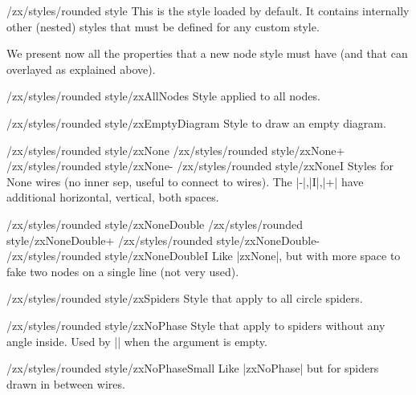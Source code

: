 \documentclass[a4paper,doc2]{ltxdoc} %
\begin{document}
\begin{stylekey}{/zx/styles/rounded style}
  This is the style loaded by default. It contains internally other (nested) styles that must be defined for any custom style.
\end{stylekey}

We present now all the properties that a new node style must have (and that can overlayed as explained above).
\begin{stylekey}{/zx/styles/rounded style/zxAllNodes}
  Style applied to all nodes.
\end{stylekey}

\begin{stylekey}{/zx/styles/rounded style/zxEmptyDiagram}
  Style to draw an empty diagram.
\end{stylekey}

\begin{pgfmanualentry}
  \makeatletter
  \def\extrakeytext{style, }
  \extractkey/zx/styles/rounded style/zxNone\@nil%
  \extractkey/zx/styles/rounded style/zxNone+\@nil%
  \extractkey/zx/styles/rounded style/zxNone-\@nil%
  \extractkey/zx/styles/rounded style/zxNoneI\@nil%
  \makeatother
  \pgfmanualbody
  Styles for None wires (no inner sep, useful to connect to wires). The |-|,|I|,|+| have additional horizontal, vertical, both spaces.
\end{pgfmanualentry}

\begin{pgfmanualentry}
  \makeatletter
  \def\extrakeytext{style, }
  \extractkey/zx/styles/rounded style/zxNoneDouble\@nil%
  \extractkey/zx/styles/rounded style/zxNoneDouble+\@nil%
  \extractkey/zx/styles/rounded style/zxNoneDouble-\@nil%
  \extractkey/zx/styles/rounded style/zxNoneDoubleI\@nil%
  \makeatother
  \pgfmanualbody
  Like |zxNone|, but with more space to fake two nodes on a single line (not very used).
\end{pgfmanualentry}

\begin{stylekey}{/zx/styles/rounded style/zxSpiders}
  Style that apply to all circle spiders.
\end{stylekey}

\begin{stylekey}{/zx/styles/rounded style/zxNoPhase}
  Style that apply to spiders without any angle inside. Used by |\zxX{}| when the argument is empty.
\end{stylekey}

\begin{stylekey}{/zx/styles/rounded style/zxNoPhaseSmall}
  Like |zxNoPhase| but for spiders drawn in between wires.
\end{stylekey}
\end{document}
